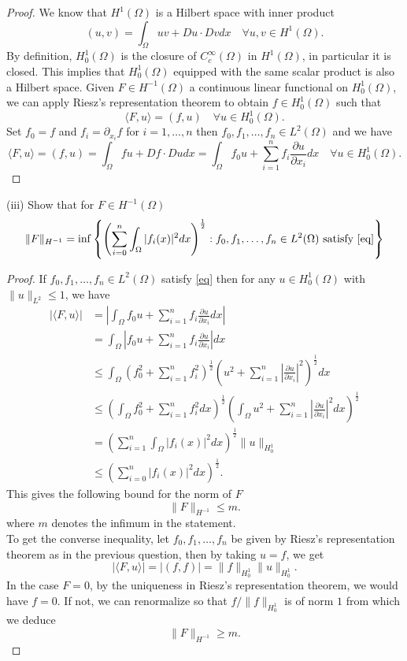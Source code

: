 \documentclass{article}
\begin{document}
\begin{proof}
    We know that $H^1(\Omega)$ is a Hilbert space with inner product
    \[
    (u,v)=\int_{\Omega}uv+Du\cdot Dvdx\quad\forall u,v\in H^1(\Omega).
    \]
    By definition, $H_0^1(\Omega)$ is the closure of $C_c^\infty(\Omega)$ in $H^1(\Omega)$, in particular it is closed. This implies that $H_0^1(\Omega)$ equipped with the same scalar product is also a Hilbert space. Given $F\in H^{-1}(\Omega)$ a continuous linear functional on $H_0^1(\Omega)$, we can apply Riesz's representation theorem to obtain $f\in H_0^1(\Omega)$ such that
    \[
    \langle F,u\rangle=(f,u)\quad\forall u\in H_0^1(\Omega).
    \]
    Set $f_0=f$ and $f_i=\partial_{x_i}f$ for $i=1,\dots,n$ then $f_0,f_1,\dots,f_n\in L^2(\Omega)$ and we have
    \[
    \langle F,u\rangle=(f,u)=\int_{\Omega}fu+Df\cdot Dudx=\int_{\Omega}f_0u+\sum_{i=1}^nf_i\frac{\partial u}{\partial x_i}dx\quad\forall u\in H_0^1(\Omega).
    \]
\end{proof}
(iii) Show that for $F\in H^{-1}(\Omega)$
\[
\lVert F\rVert_{H^{-1}}=\inf\left\{\left(\sum_{i=0}^n\int_{\Omega}|f_i(x)|^2dx\right)^{\frac{1}{2}}:f_0,f_1,\dots,f_n\in L^2(\Omega)\text{ satisfy }\eqref{eq}\right\}
\]
\begin{proof}
    If $f_0,f_1,\dots,f_n\in L^2(\Omega)$ satisfy \eqref{eq} then for any $u\in H_0^1(\Omega)$ with $\lVert u\rVert_{L^2}\leq 1$, we have
    \[
    \begin{aligned}
    |\langle F,u\rangle|&=\left|\int_{\Omega}f_0u+\sum_{i=1}^nf_i\frac{\partial u}{\partial x_i}dx\right|\\
    &=\int_{\Omega}\left|f_0u+\sum_{i=1}^nf_i\frac{\partial u}{\partial x_i}\right|dx\\
    &\leq\int_{\Omega}\left(f_0^2+\sum_{i=1}^nf_i^2\right)^{\frac{1}{2}}\left(u^2+\sum_{i=1}^n\left|\frac{\partial u}{\partial x_i}\right|^2\right)^\frac{1}{2}dx\\
    &\leq\left(\int_{\Omega}f_0^2+\sum_{i=1}^nf_i^2dx\right)^{\frac{1}{2}}\left(\int_\Omega u^2+\sum_{i=1}^n\left|\frac{\partial u}{\partial x_i}\right|^2dx\right)^{\frac{1}{2}}\\
    &=\left(\sum_{i=1}^n\int_\Omega |f_i(x)|^2dx\right)^\frac{1}{2}\lVert u\rVert_{H_0^1}\\
    &\leq\left(\sum_{i=0}^n|f_i(x)|^2dx\right)^\frac{1}{2}.
\end{aligned}
    \]
    This gives the following bound for the norm of $F$
    \[
    \lVert F\rVert_{H^{-1}}\leq m.
    \]
where $m$ denotes the infimum in the statement.\\
To get the converse inequality, let $f_0,f_1,\dots,f_n$ be given by Riesz's representation theorem as in the previous question, then by taking $u=f$, we get
\[
|\langle F,u\rangle|=|(f,f)|=\lVert f\rVert_{H_0^1}\lVert u\rVert_{H_0^1}.
\]
In the case $F=0$, by the uniqueness in Riesz's representation theorem, we would have $f=0$. If not, we can renormalize so that $f/\lVert f\rVert_{H_0^1}$ is of norm $1$ from which we deduce 
\[
\lVert F\rVert_{H^{-1}}\geq m.
\]
\end{proof}
\end{document}
